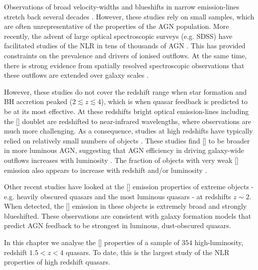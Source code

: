 Observations of broad velocity-widths and blueshifts in narrow emission-lines stretch back several decades \citep[e.g.][]{weedman70,stockton76,heckman81,veron81,feldman82,heckman84,vrtilek85,whittle85,boroson92}. 
However, these studies rely on small samples, which are often unrepresentative of the properties of the AGN population. 
More recently, the advent of large optical spectroscopic surveys (e.g. SDSS) have facilitated studies of the NLR in tens of thousands of AGN \citep[e.g.][]{boroson05,greene05a,zhang11,mullaney13,zakamska14,shen14}. 
This has provided constraints on the prevalence and drivers of ionised outflows.   
At the same time, there is strong evidence from spatially resolved spectroscopic observations that these outflows are extended over galaxy scales \citep[e.g.][]{greene09,greene11,hainline13,harrison12,harrison14}. 

However, these studies do not cover the redshift range when star formation and BH accretion peaked ($2 \lesssim z \lesssim 4$), which is when quasar feedback is predicted to be at its most effective.  
At these redshifts bright optical emission-lines including the [] doublet are redshifted to near-infrared wavelengths, where observations are much more challenging. 
As a consequence, studies at high redshifts have typically relied on relatively small numbers of objects \citep[e.g.][]{netzer04,sulentic04,shen16a}.
These studies find [] to be broader in more luminous AGN, suggesting that AGN efficiency in driving galaxy-wide outflows increases with luminosity \citep[e.g.][]{netzer04,nesvadba08,kim13,brusa15,carniani15,perna15,bischetti16}. 
The fraction of objects with very weak [] emission also appears to increase with redshift and/or luminosity \citep[e.g.][]{netzer04}. 

Other recent studies have looked at the [] emission properties of extreme objects - e.g. heavily obscured quasars \citep{zakamska16} and the most luminous quasars \citep{bischetti16} - at redshifts $z\sim2$. 
When detected, the [] emission in these objects is extremely broad and strongly blueshifted. 
These observations are consistent with galaxy formation models that predict AGN feedback to be strongest in luminous, dust-obscured quasars.

In this chapter we analyse the [] properties of a sample of $354$ high-luminosity, redshift $1.5 < z < 4$ quasars.
To date, this is the largest study of the NLR properties of high redshift quasars. 

